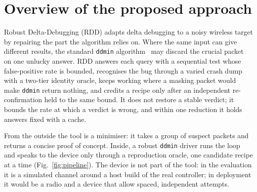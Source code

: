 \section{Overview of the proposed approach}\label{sec:our_approach}

Robust Delta-Debugging (RDD) adapts delta debugging to a noisy wireless target by
repairing the part the algorithm relies on. Where the same input can give
different results, the standard \texttt{ddmin} algorithm~\cite{ddmin2002} may
discard the crucial packet on one unlucky answer. RDD answers each query with a
sequential test whose false-positive rate is bounded, recognises the bug through
a varied crash dump with a two-tier identity oracle, keeps working where a
masking packet would make \texttt{ddmin} return nothing, and credits a recipe
only after an independent re-confirmation held to the same bound. It does not
restore a stable verdict; it bounds the rate at which a verdict is wrong, and
within one reduction it holds answers fixed with a cache.

From the outside the tool is a minimiser: it takes a group of suspect packets and
returns a concise proof of concept. Inside, a robust \texttt{ddmin} driver runs the
loop and speaks to the device only through a reproduction oracle, one candidate
recipe at a time (Fig.~\ref{fig:pipeline}). The device is not part of the tool:
in the evaluation it is a simulated channel around a host build of the real
controller; in deployment it would be a radio and a device that allow spaced,
independent attempts.

